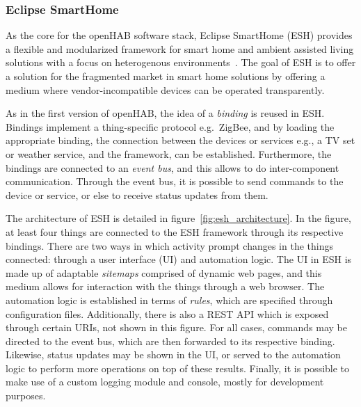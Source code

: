 \documentclass[12pt]{article}
\begin{document}
\subsubsection{Eclipse SmartHome}

As the core for the openHAB software stack, Eclipse SmartHome (ESH) provides a flexible and modularized framework for smart home and ambient assisted living solutions with a focus on heterogenous environments~\cite{esh_01}. The goal of ESH is to offer a solution for the fragmented market in smart home solutions by offering a medium where vendor-incompatible devices can be operated transparently.

As in the first version of openHAB, the idea of a \emph{binding} is reused in ESH. Bindings implement a thing-specific protocol e.g.\ ZigBee, and by loading the appropriate binding, the connection between the devices or services e.g., a TV set or weather service, and the framework, can be established. Furthermore, the bindings are connected to an \emph{event bus}, and this allows to do inter-component communication. Through the event bus, it is possible to send commands to the device or service, or else to receive status updates from them.

The architecture of ESH is detailed in figure~\ref{fig:esh_architecture}. In the figure, at least four things are connected to the ESH framework through its respective bindings. There are two ways in which activity prompt changes in the things connected: through a user interface (UI) and automation logic. The UI in ESH is made up of adaptable \emph{sitemaps} comprised of dynamic web pages, and this medium allows for interaction with the things through a web browser. The automation logic is established in terms of \emph{rules}, which are specified through configuration files. Additionally, there is also a REST API which is exposed through certain URIs, not shown in this figure. For all cases, commands may be directed to the event bus, which are then forwarded to its respective binding. Likewise, status updates may be shown in the UI, or served to the automation logic to perform more operations on top of these results. Finally, it is possible to make use of a custom logging module and console, mostly for development purposes.
\end{document}
